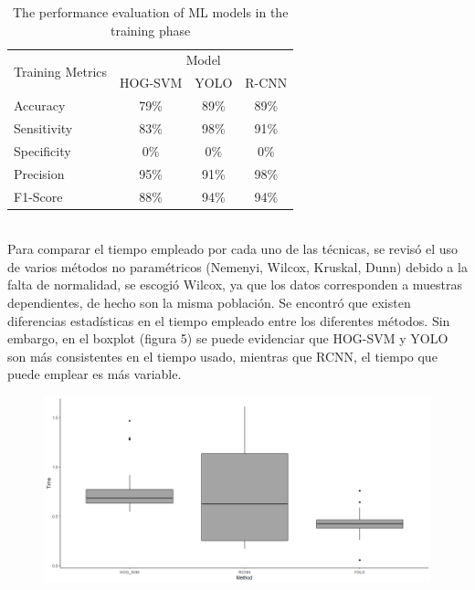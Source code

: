 \documentclass[journal,article,submit,moreauthors,pdftex]{Definitions/mdpi}
\begin{document}
\begin{table}[H]
\centering
\caption{The performance evaluation of ML models in the training phase}
\begin{tabular}{|l|c|c|c|}
\hline
\multicolumn{1}{|c|}{\multirow{2}{*}{Training Metrics}} & \multicolumn{3}{c|}{Model} \\ \cline{2-4} 
\multicolumn{1}{|c|}{}                                  & HOG-SVM     & YOLO    & R-CNN  \\ \hline
Accuracy                                                & 79\%  & 89\%  & 89\% \\ \hline
Sensitivity                                             & 83\%  & 98\%  & 91\% \\ \hline
Specificity                                             & 0\%     & 0\%     & 0\%    \\ \hline
Precision                                               & 95\%  & 91\%    & 98\%   \\ \hline
F1-Score                                                & 88\%  & 94\%  & 94\% \\ \hline
\end{tabular}
\end{table}
\\



%    




Para comparar el tiempo empleado por cada uno de las técnicas, se revisó el uso de varios métodos no paramétricos (Nemenyi, Wilcox, Kruskal, Dunn) debido a la falta de normalidad, se escogió Wilcox, ya que los datos corresponden a muestras dependientes, de hecho son la misma población. Se encontró que existen diferencias estadísticas en el tiempo empleado entre los diferentes métodos. Sin embargo, en el boxplot (figura 5) se puede evidenciar que HOG-SVM y YOLO son más consistentes en el tiempo usado, mientras que RCNN, el tiempo que puede emplear es más variable.
\\
\begin{figure}[H]
    \centering
    \includegraphics[scale=0.3]{boxplot1.png}
     \centering
    \caption{}
\end{figure}
\end{document}
